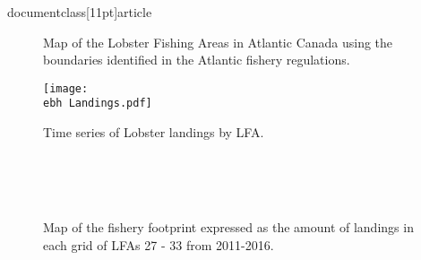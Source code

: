 documentclass[11pt]{article}
\usepackage{graphicx}
\usepackage{subfig}
\usepackage{pdfcomment}
\usepackage{amsmath}
\usepackage{lscape}
\usepackage{hyperref}
\usepackage[top=2.4cm, bottom=2.4cm, left=3cm, right=3cm]{geometry}
\usepackage{fancyhdr}
\pagestyle{fancy}

\cfoot{\thepage}
\renewcommand{\headrulewidth}{0.4pt}
\renewcommand{\footrulewidth}{0.4pt}
\newcommand{\D}{.}
\newcommand{\tl}{\textless}
\newcommand{\e}{/backup/bio_data/bio.lobster/figures/} %
\newcommand{\ebh}{/backup/bio_data/bio.lobster/figures/LFA2733Framework2018/} %
\newcommand{\cp}{\caption}



\begin{landscape}
\begin{figure}
\centering
    \caption{Map of the Lobster Fishing Areas in Atlantic Canada using the boundaries identified in the Atlantic fishery regulations.}

\end{figure}
\end{landscape}

   \begin{figure}
    \centering
        \texttt{[image: \\ebh Landings.pdf]}
        \caption{Time series of Lobster landings by LFA.}

    \end{figure}


  \begin{figure}
        \centering
                \\
                \\
                \\
        
         \caption{Map of the fishery footprint expressed as the amount of landings in each grid of LFAs 27 - 33 from 2011-2016.}
        \end{figure}

